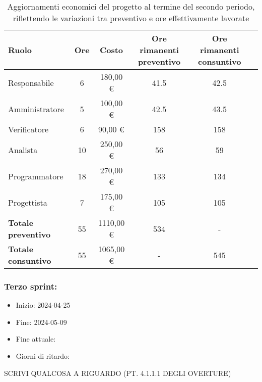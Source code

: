 \newpage
{} %
\begin{table}[!h]
    \centering
    \begin{tabular}{|l| c| c| c| c| c| } 
        \hline
        \textbf{Ruolo} & \textbf{Ore} & \textbf{Costo} & \textbf{Ore rimanenti preventivo} & \textbf{Ore rimanenti consuntivo} \\
        \hline  
        Responsabile               &  6   &  180,00 € &  41.5 &  42.5 \\ 
        Amministratore             &  5   &  100,00 € &  42.5 &  43.5 \\ 
        Verificatore               &  6   &   90,00 € & 158   & 158   \\ 
        Analista                   & 10   &  250,00 € &  56   &  59   \\ 
        Programmatore              & 18   &  270,00 € & 133   & 134   \\
        Progettista                &  7   &  175,00 € & 105   & 105   \\
        \hline
        \textbf{Totale preventivo} & 55   & 1110,00 € & 534   &   -   \\
        \hline
        \textbf{Totale consuntivo} & 55   & 1065,00 € &   -   & 545   \\
        \hline
    \end{tabular}
    \caption{Aggiornamenti economici del progetto al termine del secondo periodo, riflettendo le variazioni tra preventivo e ore effettivamente lavorate}
    \label{tab:7}
\end{table}

\subsubsection{Terzo sprint:}
\begin{itemize}
    \item Inizio: 2024-04-25
    \item Fine: 2024-05-09
    \item Fine attuale:
    \item Giorni di ritardo:
\end{itemize}

SCRIVI QUALCOSA A RIGUARDO (PT. 4.1.1.1 DEGLI OVERTURE)

